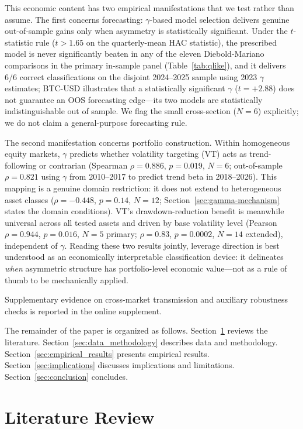 This economic content has two empirical manifestations that we test rather than assume. The first concerns forecasting: $\gamma$-based model selection delivers genuine out-of-sample gains only when asymmetry is statistically significant. Under the $t$-statistic rule ($t > 1.65$ on the quarterly-mean HAC statistic), the prescribed model is never significantly beaten in any of the eleven Diebold-Mariano comparisons in the primary in-sample panel (Table~\ref{tab:qlike}), and it delivers 6/6 correct classifications on the disjoint 2024--2025 sample using 2023 $\gamma$ estimates; BTC-USD illustrates that a statistically significant $\gamma$ ($t = +2.88$) does not guarantee an OOS forecasting edge---its two models are statistically indistinguishable out of sample. We flag the small cross-section ($N = 6$) explicitly; we do not claim a general-purpose forecasting rule.

The second manifestation concerns portfolio construction. Within homogeneous equity markets, $\gamma$ predicts whether volatility targeting (VT) acts as trend-following or contrarian (Spearman $\rho = 0.886$, $p = 0.019$, $N = 6$; out-of-sample $\rho = 0.821$ using $\gamma$ from 2010--2017 to predict trend beta in 2018--2026). This mapping is a genuine domain restriction: it does not extend to heterogeneous asset classes ($\rho = -0.448$, $p = 0.14$, $N = 12$; Section~\ref{sec:gamma-mechanism} states the domain conditions). VT's drawdown-reduction benefit is meanwhile universal across all tested assets and driven by base volatility level (Pearson $\rho = 0.944$, $p = 0.016$, $N = 5$ primary; $\rho = 0.83$, $p = 0.0002$, $N = 14$ extended), independent of $\gamma$. Reading these two results jointly, leverage direction is best understood as an economically interpretable classification device: it delineates \emph{when} asymmetric structure has portfolio-level economic value---not as a rule of thumb to be mechanically applied.

Supplementary evidence on cross-market transmission and auxiliary robustness checks is reported in the online supplement.

The remainder of the paper is organized as follows. Section~\ref{sec:literature} reviews the literature. Section~\ref{sec:data_methodology} describes data and methodology. Section~\ref{sec:empirical_results} presents empirical results. Section~\ref{sec:implications} discusses implications and limitations. Section~\ref{sec:conclusion} concludes.



\section{Literature Review}\label{sec:literature}

